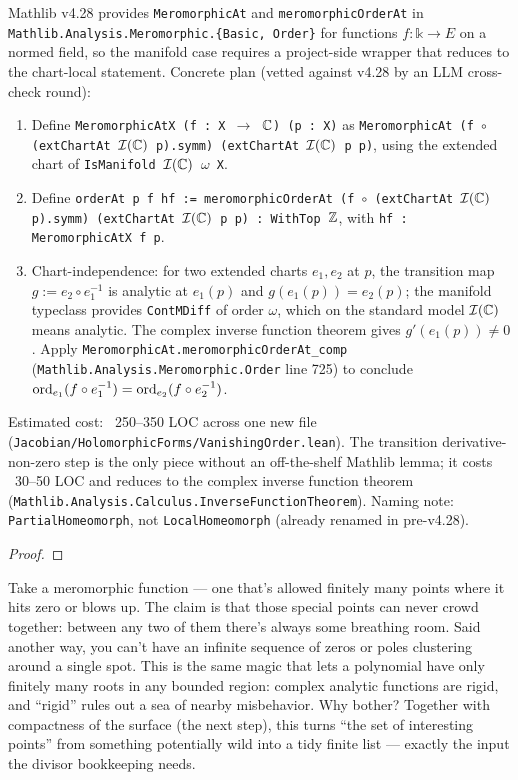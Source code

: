 \begin{proofsketch}
Mathlib v4.28 provides \texttt{MeromorphicAt} and \texttt{meromorphicOrderAt}
in \texttt{Mathlib.Analysis.Meromorphic.\{Basic, Order\}} for functions
\(f : \mathbb{k} \to E\) on a normed field, so the manifold case requires a
project-side wrapper that reduces to the chart-local statement. Concrete
plan (vetted against v4.28 by an LLM cross-check round):

\begin{enumerate}
\item Define \texttt{MeromorphicAtX (f : X $\to$ \(\mathbb{C}\)) (p : X)} as
  \texttt{MeromorphicAt (f $\circ$ (extChartAt $\mathcal I(\mathbb{C})$ p).symm)
  (extChartAt $\mathcal I(\mathbb{C})$ p p)}, using the extended chart of
  \texttt{IsManifold $\mathcal I(\mathbb{C})$ $\omega$ X}.
\item Define \texttt{orderAt p f hf := meromorphicOrderAt (f $\circ$
  (extChartAt $\mathcal I(\mathbb{C})$ p).symm) (extChartAt $\mathcal I(\mathbb{C})$ p p) :
  WithTop $\mathbb{Z}$}, with \texttt{hf : MeromorphicAtX f p}.
\item Chart-independence: for two extended charts
  \(e_1, e_2\) at \(p\), the transition map
  \(g := e_2 \circ e_1^{-1}\) is analytic at \(e_1(p)\) and
  \(g(e_1(p)) = e_2(p)\); the manifold typeclass provides
  \texttt{ContMDiff} of order \(\omega\), which on the standard model
  \(\mathcal I(\mathbb{C})\) means analytic. The complex inverse function theorem
  gives \(g'(e_1(p)) \ne 0\). Apply
  \texttt{MeromorphicAt.meromorphicOrderAt\_comp}
  (\texttt{Mathlib.Analysis.Meromorphic.Order} line 725) to conclude
  \(\operatorname{ord}_{e_1}(f \circ e_1^{-1}) = \operatorname{ord}_{e_2}(f \circ e_2^{-1})\).
\end{enumerate}

Estimated cost: ~250--350 LOC across one new file
(\texttt{Jacobian/HolomorphicForms/VanishingOrder.lean}). The transition
derivative-non-zero step is the only piece without an off-the-shelf
Mathlib lemma; it costs ~30--50 LOC and reduces to the complex inverse
function theorem (\texttt{Mathlib.Analysis.Calculus.InverseFunctionTheorem}).
Naming note: \texttt{PartialHomeomorph}, not \texttt{LocalHomeomorph}
(already renamed in pre-v4.28).
\end{proofsketch}


\begin{proof}\leanok\end{proof}

\begin{layman}
Take a meromorphic function --- one that's allowed finitely many points where
it hits zero or blows up. The claim is that those special points can never
crowd together: between any two of them there's always some breathing room.
Said another way, you can't have an infinite sequence of zeros or poles
clustering around a single spot. This is the same magic that lets a
polynomial have only finitely many roots in any bounded region: complex
analytic functions are rigid, and ``rigid'' rules out a sea of nearby
misbehavior. Why bother? Together with compactness of the surface (the next
step), this turns ``the set of interesting points'' from something
potentially wild into a tidy finite list --- exactly the input the divisor
bookkeeping needs.
\end{layman}

